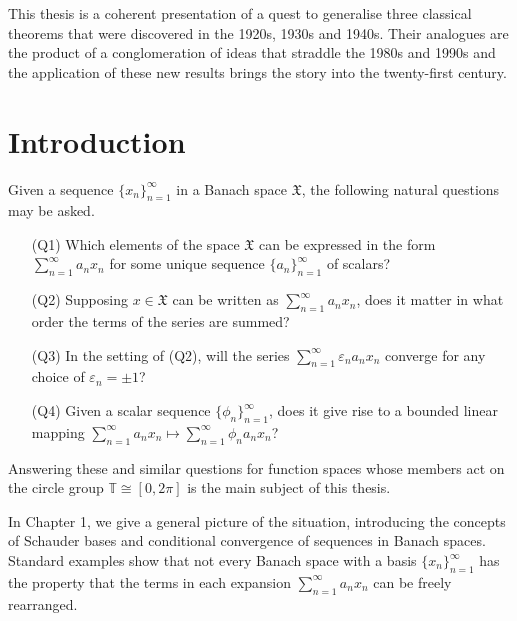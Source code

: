\documentclass[12pt]{UNSWthesis}
\newcommand{\T}{\mathbb{T}}
\newcommand{\X}{\mathfrak{X}}
\newcommand\blankpage{%
    \null
    \thispagestyle{empty}%
    \addtocounter{page}{-1}%
    \newpage}
\numberwithin{equation}{section}
\begin{document}


This thesis is a coherent presentation of a quest to generalise three classical
theorems that were discovered in the 1920s, 1930s and 1940s. Their analogues are
the product of a conglomeration of ideas that straddle the 1980s and 1990s and
the application of these new results brings the story into the twenty-first
century.
\afterpage{\blankpage}


\afterpreface

%
%

\afterpage{\blankpage}

\chapter{Introduction}\label{s-intro}


{\noindent}Given a sequence $\{x_n\}_{n=1}^{\infty}$ in a Banach space $\X$,
the following natural questions may be asked.
\begin{enumerate}
\item[(Q1)] Which elements of the space $\X$ can be expressed in the form
$\sum_{n=1}^{\infty}a_nx_n$ for some unique sequence $\{a_n\}_{n=1}^{\infty}$
of scalars?

\item[(Q2)] Supposing $x\in\X$ can be written as $\sum_{n=1}^{\infty}a_nx_n$,
does it matter in what order the terms of the series are summed?

\item[(Q3)] In the setting of (Q2), will the series
$\sum_{n=1}^{\infty}\varepsilon_na_nx_n$ converge for any choice of
$\varepsilon_n=\pm 1$?

\item[(Q4)] Given a scalar sequence $\{\phi_n\}_{n=1}^{\infty}$, does it give
rise to a bounded linear mapping
$\sum_{n=1}^{\infty}a_nx_n\mapsto\sum_{n=1}^{\infty}\phi_na_nx_n$?
\end{enumerate}

{\noindent}Answering these and similar questions for
function spaces whose members act on the circle group $\T\cong[0,2\pi]$
is the main subject of this thesis.

In Chapter 1, we give a general picture of the situation, introducing the
concepts of Schauder bases and conditional convergence of sequences in Banach
spaces. Standard examples show that not every Banach space with a basis
$\{x_n\}_{n=1}^{\infty}$ has the property that the terms in each expansion 
$\sum_{n=1}^{\infty}a_nx_n$ can be freely rearranged.
\end{document}
